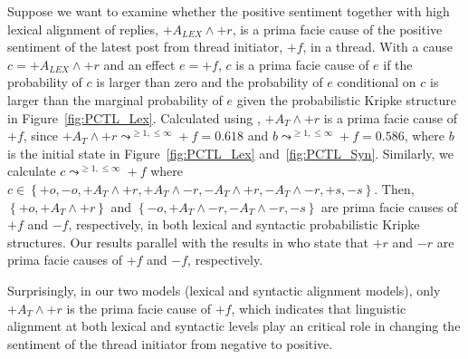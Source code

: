 \documentclass[man,biblatex,floatsintext]{apa6}
\begin{document}
Suppose we want to examine whether the positive sentiment together with high lexical alignment of replies, $+A_{LEX} \wedge +r$, is a prima facie cause of the positive sentiment of the latest post from thread initiator, $+f$, in a thread. With a cause $c=+A_{LEX} \wedge +r$ and an effect $e=+f$, $c$ is a prima facie cause of $e$ if the probability of $c$ is larger than zero and the probability of $e$ conditional on $c$ is larger than the marginal probability of $e$ given the probabilistic Kripke structure in Figure~\ref{fig:PCTL_Lex}. Calculated using \textcite{hansson1994logic}, $+A_{T}\wedge+r$ is a prima facie cause of $+f$, since $+A_{T}\wedge+r\leadsto^{\geq 1,\leq \infty}+f = 0.618 $ and $b\leadsto^{\geq 1,\leq \infty}+f = 0.586$, where $b$ is the initial state in Figure~\ref{fig:PCTL_Lex} and~\ref{fig:PCTL_Syn}. Similarly, we calculate $c\leadsto^{\geq 1,\leq \infty}+f$ where $c \in \left \{+o, -o, +A_{T}\wedge+r, +A_{T}\wedge-r, -A_{T}\wedge+r, -A_{T}\wedge-r, +s, -s \right \}$. Then, $\left \{ +o, +A_{T}\wedge +r \right \}$ and $\left \{ -o, +A_{T}\wedge -r, -A_{T} \wedge -r, -s \right \}$ are prima facie causes of $+f$ and $-f$, respectively, in both lexical and syntactic probabilistic Kripke structures. Our results parallel with the results in \textcite{bui2015temporal} who state that $+r$ and $-r$ are prima facie causes of $+f$ and $-f$, respectively.


Surprisingly, in our two models (lexical and syntactic alignment models), only $+A_T \wedge +r$ is the prima facie cause of $+f$, which indicates that linguistic alignment at both lexical and syntactic levels play an critical role in changing the sentiment of the thread initiator from negative to positive. %

\end{document}
